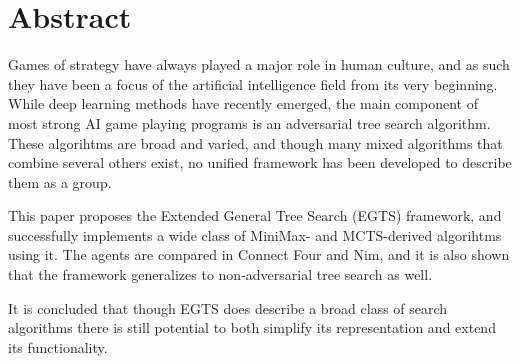 \section*{Abstract}

Games of strategy have always played a major role in human culture, and as such they have been a focus of the artificial intelligence field from its very beginning. While deep learning methods have recently emerged, the main component of most strong AI game playing programs is an adversarial tree search algorithm. These algorihtms are broad and varied, and though many mixed algorithms that combine several others exist, no unified framework has been developed to describe them as a group. 

This paper proposes the Extended General Tree Search (EGTS) framework, and successfully implements a wide class of MiniMax- and MCTS-derived algorihtms using it. The agents are compared in Connect Four and Nim, and it is also shown that the framework generalizes to non-adversarial tree search as well.

It is concluded that though EGTS does describe a broad class of search algorithms there is still potential to both simplify its representation and extend its functionality.